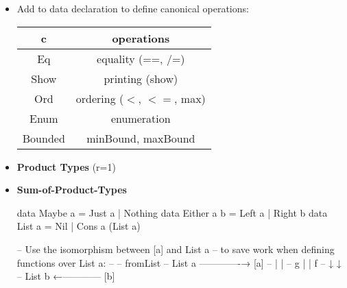 \begin{itemize}
  \item Add  to data declaration to define canonical operations: 
\begin{center}\begin{tabular}{|c|c|}\hline
  \rowcolor{grau} c       & operations                          \\\hline
                  Eq      & equality (==, /=)                   \\\hline
                  Show    & printing (show)                     \\\hline
                  Ord     & ordering ($<$, $<=$, max)           \\\hline
                  Enum    & enumeration                         \\\hline
                  Bounded & minBound, maxBound                  \\\hline
  \end{tabular}\end{center}
  \item \textbf{Product Types} (r=1)\\
  \item \textbf{Sum-of-Product-Types}\\
\begin{Haskell}
data Maybe a = Just a | Nothing
data Either a b = Left a | Right b
data List a = Nil | Cons a (List a)
\end{Haskell}


\begin{Haskell}
-- Use the isomorphism between [a] and List a
-- to save work when defining functions over List a:
--
--                 fromList
--       List a -------------→ [a]
--         |                    |
--       g |                    | f
--         ↓                    ↓
--       List b ←------------ [b]
\end{Haskell}

        
\end{itemize}
